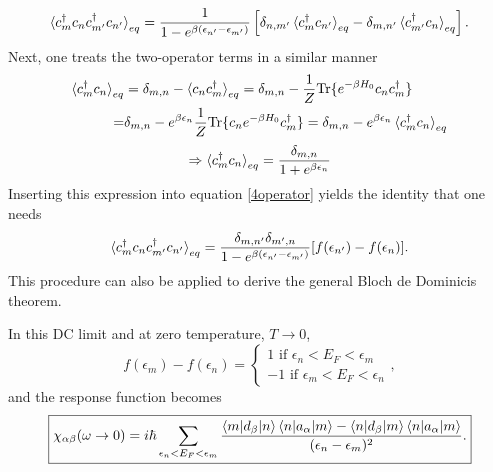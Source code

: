 \documentclass[a4paper,12pts,dvipsnames]{article}
\numberwithin{equation}{section}
\begin{document}
\begin{mdframed}[backgroundcolor=gray!16]
\begin{center}
\begin{minipage}{42em}
			\begin{equation}\label{4operator}
			\braket{c^{\dagger}_mc_nc^{\dagger}_{m'}c_{n'}}_{eq} = \frac{1}{1-e^{\beta\left(\epsilon_{n'}-\epsilon_{m'}\right)}}\left[\delta_{n,m'}\braket{c^{\dagger}_mc_{n'}}_{eq} - \delta_{m,n'}\braket{c^{\dagger}_{m'}c_n}_{eq}\right].
			\end{equation}
			Next, one treats the two-operator terms in a similar manner
			\begin{align}
			\braket{c^{\dagger}_mc_n}_{eq} &= \delta_{m,n} - \braket{c_nc^{\dagger}_m}_{eq} = \delta_{m,n} - \frac{1}{Z}\text{Tr}\{e^{-\beta H_0}c_nc^{\dagger}_m\}\\ =& \delta_{m,n} - e^{\beta\epsilon_n}\frac{1}{Z}\text{Tr}\{c_ne^{-\beta H_0}c^{\dagger}_m\} = \delta_{m,n} - e^{\beta\epsilon_n}\braket{c^{\dagger}_mc_n}_{eq}
			\end{align}
			\begin{equation}
				\Rightarrow \braket{c^{\dagger}_mc_n}_{eq} = \frac{\delta_{m,n}}{1+e^{\beta\epsilon_n}}
			\end{equation}
			Inserting this expression into equation \ref{4operator} yields the identity that one needs
			\begin{align}
			\braket{c^{\dagger}_mc_nc^{\dagger}_{m'}c_{n'}}_{eq} = \frac{\delta_{m,n'}\delta_{m',n}}{1-e^{\beta\left(\epsilon_{n'}-\epsilon_{m'}\right)}}[f(\epsilon_{n'}) - f(\epsilon_{n})].
			\end{align}
			This procedure can also be applied to derive the general Bloch de Dominicis theorem.
		\end{minipage}
	\end{center}
\end{mdframed}
In this DC limit and at zero temperature, $T\rightarrow0$,
\begin{equation*}
	f(\epsilon_m) - f(\epsilon_n) = \left\lbrace\begin{array}{rcl}
		1 \text{ if } \epsilon_n<E_F<\epsilon_m\\
		-1 \text{ if } \epsilon_m<E_F<\epsilon_n
	\end{array}\right.,
\end{equation*}
and the response function becomes
\begin{equation}
	\boxed{\chi_{\alpha\beta}(\omega\rightarrow0) = i\hbar\sum_{\epsilon_n<E_F<\epsilon_m}\frac{\braket{m|d_{\beta}|n}\braket{n|a_{\alpha}|m} - \braket{n|d_{\beta}|m}\braket{n|a_{\alpha}|m}}{(\epsilon_{n}-\epsilon_{m})^2}.}
\end{equation}
\end{document}
